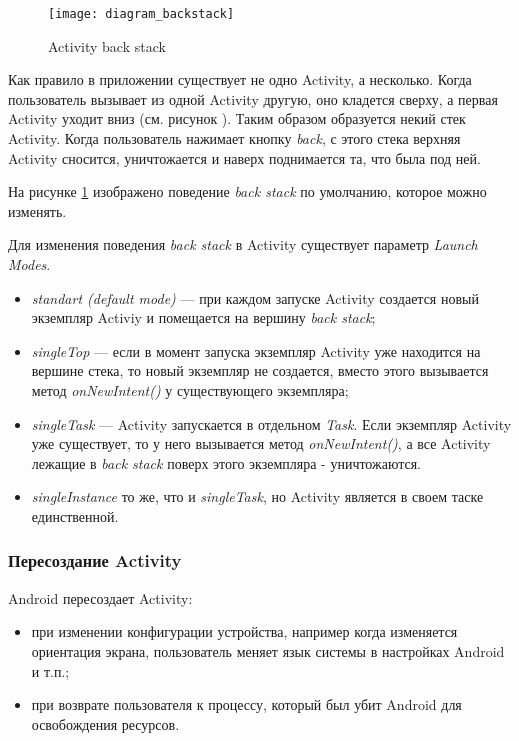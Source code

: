\begin{figure}[H]
    \centering
    \texttt{[image: diagram\_backstack]}
    \caption{Activity back stack}
    \label{fig:diagram_backstack}
\end{figure}

Как правило в приложении существует не одно Activity, а несколько. Когда пользователь вызывает из одной Activity другую, оно кладется сверху, а первая Activity уходит вниз (см. рисунок ). Таким образом образуется некий стек Activity. Когда пользователь нажимает кнопку \textit{back}, с этого стека верхняя Activity сносится, уничтожается и наверх поднимается та, что была под ней.

На рисунке \ref{fig:diagram_backstack} изображено поведение \textit{back stack} по умолчанию, которое можно изменять.

Для изменения поведения \textit{back stack} в Activity существует параметр \textit{Launch Modes}.
\begin{itemize}
	\item \textit{standart (default mode)} --- при каждом запуске Activity создается новый экземпляр Activiy и помещается на вершину \textit{back stack};
	\item \textit{singleTop} --- если в момент запуска экземпляр Activity уже находится на вершине стека, то новый экземпляр не создается, вместо этого вызывается метод \textit{onNewIntent()} у существующего экземпляра;
	\item \textit{singleTask} --- Activity запускается в отдельном \textit{Task}. Если экземпляр Activity уже существует, то у него вызывается метод \textit{onNewIntent()}, а все Activity лежащие в \textit{back stack} поверх этого экземпляра - уничтожаются.
	\item \textit{singleInstance} то же, что и \textit{singleTask}, но Activity является в своем таске единственной.
\end{itemize}


\subsubsection{Пересоздание Activity}
	Android пересоздает Activity:
	\begin{itemize}
		\item при изменении конфигурации устройства, например когда изменяется ориентация экрана, пользователь меняет язык системы в настройках Android и т.п.;
		\item при возврате пользователя к процессу, который был убит Android для освобождения ресурсов.
	\end{itemize}
	
